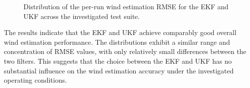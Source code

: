 \begin{figure}[htbp]
%
	
	\caption{Distribution of the per-run wind estimation RMSE for the EKF and UKF across the investigated test suite.}
	\label{fig:EKFvsUKF_histogram}

\end{figure}

The results indicate that the EKF and UKF achieve comparably good overall wind estimation performance. The distributions exhibit a similar range and concentration of RMSE values, with only relatively small differences between the two filters. This suggests that the choice between the EKF and UKF has no substantial influence on the wind estimation accuracy under the investigated operating conditions.

